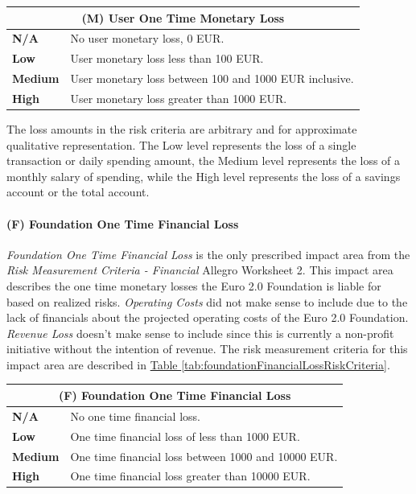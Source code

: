 \documentclass[12pt]{article} %
\newcommand{\hypertableref}[1]{\hyperref[#1]{Table \ref{#1}}}
\begin{document}
{\begin{center}
\begin{tabular}{ | l | p{12cm} | }
  \hline
  \multicolumn{2}{|c|}{\textbf{(M) User One Time Monetary Loss}}
  \\ \hline
  \textbf{N/A} & No user monetary loss, 0 EUR.
  \\ \hline
  \textbf{Low} & User monetary loss less than 100 EUR.
  \\ \hline
  \textbf{Medium} & User monetary loss between 100 and 1000 EUR inclusive.
  \\ \hline
  \textbf{High} & User monetary loss greater than 1000 EUR.
  \\ \hline
\end{tabular}
\end{center}
\label{tab:userMonetaryLossRiskCriteria}

The loss amounts in the risk criteria are arbitrary and for approximate qualitative representation. The Low level represents the loss of a single transaction or daily spending amount, the Medium level represents the loss of a monthly salary of spending, while the High level represents the loss of a savings account or the total account.

\paragraph{(F) Foundation One Time Financial Loss}

\textit{Foundation One Time Financial Loss} is the only prescribed impact area from the \textit{Risk Measurement Criteria - Financial} Allegro Worksheet 2. This impact area describes the one time monetary losses the Euro 2.0 Foundation is liable for based on realized risks. \textit{Operating Costs} did not make sense to include due to the lack of financials about the projected operating costs of the Euro 2.0 Foundation. \textit{Revenue Loss} doesn't make sense to include since this is currently a non-profit initiative without the intention of revenue. The risk measurement criteria for this impact area are described in \hypertableref{tab:foundationFinancialLossRiskCriteria}.

\begin{center}
\begin{tabular}{ | l | p{12cm} | }
  \hline
  \multicolumn{2}{|c|}{\textbf{(F) Foundation One Time Financial Loss}}
  \\ \hline
  \textbf{N/A} & No one time financial loss.
  \\ \hline
  \textbf{Low} & One time financial loss of less than 1000 EUR.
  \\ \hline
  \textbf{Medium} & One time financial loss between 1000 and 10000 EUR.
  \\ \hline
  \textbf{High} & One time financial loss greater than 10000 EUR.
  \\ \hline
\end{tabular}
\end{center}
\label{tab:foundationFinancialLossRiskCriteria}

}
\end{document}
